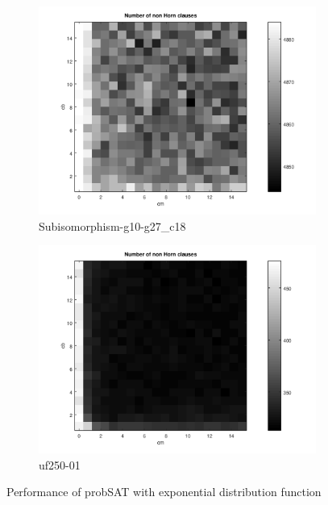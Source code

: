\documentclass[12pt,a4paper]{article}
\begin{document}
\begin{figure}[H]
  \begin{subfigure}{0.45\textwidth}
    \includegraphics[width=\textwidth]{probSAT/probSATexp_Subisomorphism-g10-g27_c18[SKIP=0].png}
    \caption{Subisomorphism-g10-g27\_c18}
  \end{subfigure}
  \begin{subfigure}{0.45\textwidth}
    \includegraphics[width=\textwidth]{probSAT/probSATexp_uf250-01[SKIP=0].png}
    \caption{uf250-01}
  \end{subfigure}
\caption{Performance of probSAT with exponential distribution function}
\label{fig:probSAT_exp}
\end{figure}
\end{document}
